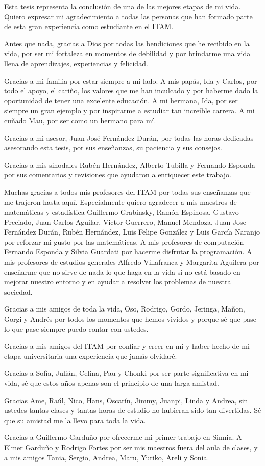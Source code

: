 \begin{acknowledgments}

Esta tesis representa la conclusión de una de las mejores etapas de mi vida. Quiero expresar mi agradecimiento a todas las personas que han formado parte de esta gran experiencia como estudiante en el ITAM.

Antes que nada, gracias a Dios por todas las bendiciones que he recibido en la vida, por ser mi fortaleza en momentos de debilidad y por brindarme una vida llena de aprendizajes, experiencias y felicidad.

Gracias a mi familia por estar siempre a mi lado. A mis papás, Ida y Carlos, por todo el apoyo, el cariño, los valores que me han inculcado y por haberme dado la oportunidad de tener una excelente educación. A mi hermana, Ida, por ser siempre un gran ejemplo y por inspirarme a estudiar tan increíble carrera. A mi cuñado Mau, por ser como un hermano para mí.

Gracias a mi asesor, Juan José Fernández Durán, por todas las horas dedicadas asesorando esta tesis, por sus enseñanzas, su paciencia y sus consejos.

Gracias a mis sinodales Rubén Hernández, Alberto Tubilla y Fernando Esponda por sus comentarios y revisiones que ayudaron a enriquecer este trabajo.

Muchas gracias a todos mis profesores del ITAM por todas sus enseñanzas que me trajeron hasta aquí. Especialmente quiero agradecer a mis maestros de matemáticas y estadística Guillermo Grabinsky, Ramón Espinosa, Gustavo Preciado, Juan Carlos Aguilar, Victor Guerrero, Manuel Mendoza, Juan Jose Fernández Durán, Rubén Hernández, Luis Felipe González y Luis García Naranjo por reforzar mi gusto por las matemáticas. A mis profesores de computación Fernando Esponda y Silvia Guardati por hacerme disfrutar la programación. A mis profesores de estudios generales Alfredo Villafranca y Margarita Aguilera por enseñarme que no sirve de nada lo que haga en la vida si no está basado en mejorar nuestro entorno y en ayudar a resolver los problemas de nuestra sociedad.

Gracias a mis amigos de toda la vida, Oso, Rodrigo, Gordo, Jeringa, Mañon, Gorgi y Andrés por todos los momentos que hemos vividos y porque sé que pase lo que pase siempre puedo contar con ustedes.

Gracias a mis amigos del ITAM por confiar y creer en mí y haber hecho de mi etapa universitaria una experiencia que jamás olvidaré.

Gracias a Sofía, Julián, Celina, Pau y Chonki por ser parte significativa en mi vida, sé que estos años apenas son el principio de una larga amistad.

Gracias Ame, Raúl, Nico, Hans, Oscarín, Jimmy, Juanpi, Linda y Andrea, sin ustedes tantas clases y tantas horas de estudio no hubieran sido tan divertidas. Sé que su amistad me la llevo para toda la vida.

Gracias a Guillermo Garduño por ofrecerme mi primer trabajo en Sinnia. A Elmer Garduño y Rodrigo Fortes por ser mis maestros fuera del aula de clases, y a mis amigos Tania, Sergio, Andrea, Maru, Yuriko, Areli y Sonia.

\end{acknowledgments}
